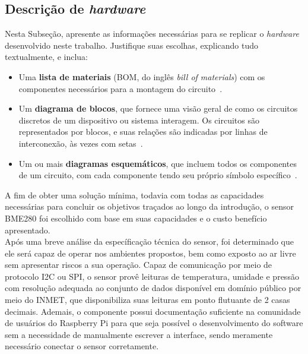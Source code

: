 \subsection{Descrição de \textit{hardware}}\label{subsec:hardware}

Nesta Subseção, apresente as informações necessárias para se replicar o \textit{hardware} desenvolvido neste trabalho. 
Justifique suas escolhas, explicando tudo textualmente, e inclua:

\begin{itemize}
    \item Uma \textbf{lista de materiais} (BOM, do inglês \textit{bill of materials}) com os componentes necessários para a montagem do circuito~\cite{ref:bom}.
    \item Um \textbf{diagrama de blocos}, que fornece uma visão geral de como os circuitos discretos de um dispositivo ou sistema interagem. Os circuitos são representados por blocos, e suas relações são indicadas por linhas de interconexão, às vezes com setas~\cite{ref:blockdiagram}.
    \item Um ou mais \textbf{diagramas esquemáticos}, que incluem todos os componentes de um circuito, com cada componente tendo seu próprio símbolo específico~\cite{ref:esquematico}.
\end{itemize}
A fim de obter uma solução mínima, todavia com todas as capacidades necessárias para concluir os objetivos traçados ao longo da introdução, o sensor BME280 foi escolhido com base em suas capacidades e o custo benefício apresentado.\\

Após uma breve análise da específicação técnica do sensor, foi determinado que ele será capaz de operar nos ambientes propostos, bem como exposto ao ar livre sem apresentar riscos a sua operação. Capaz de comunicação por meio de protocolo I2C ou SPI, o sensor provê leituras de temperatura, umidade e pressão com resolução adequada ao conjunto de dados disponível em domínio público por meio do INMET\cite{inmet}, que disponibiliza suas leituras em ponto flutuante de 2 casas decimais. Ademais, o componente possui documentação suficiente na comunidade de usuários do Raspberry Pi para que seja possível o desenvolvimento do software sem a necessidade de manualmente escrever a interface, sendo meramente necessário conectar o sensor corretamente. \\

